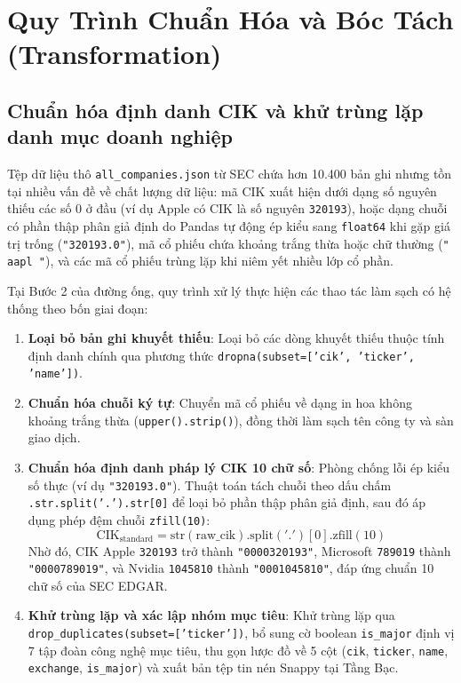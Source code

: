 \section{Quy Trình Chuẩn Hóa và Bóc Tách (Transformation)}

\subsection{Chuẩn hóa định danh CIK và khử trùng lặp danh mục doanh nghiệp}
Tệp dữ liệu thô \texttt{all\_companies.json} từ SEC chứa hơn 10.400 bản ghi nhưng tồn tại nhiều vấn đề về chất lượng dữ liệu: mã CIK xuất hiện dưới dạng số nguyên thiếu các số 0 ở đầu (ví dụ Apple có CIK là số nguyên \texttt{320193}), hoặc dạng chuỗi có phần thập phân giả định do Pandas tự động ép kiểu sang \texttt{float64} khi gặp giá trị trống (\texttt{"320193.0"}), mã cổ phiếu chứa khoảng trắng thừa hoặc chữ thường (\texttt{" aapl "}), và các mã cổ phiếu trùng lặp khi niêm yết nhiều lớp cổ phần.

Tại Bước 2 của đường ống, quy trình xử lý thực hiện các thao tác làm sạch có hệ thống theo bốn giai đoạn:
\begin{enumerate}
    \item \textbf{Loại bỏ bản ghi khuyết thiếu}: Loại bỏ các dòng khuyết thiếu thuộc tính định danh chính qua phương thức \texttt{dropna(subset=['cik', 'ticker', 'name'])}.
    \item \textbf{Chuẩn hóa chuỗi ký tự}: Chuyển mã cổ phiếu về dạng in hoa không khoảng trắng thừa (\texttt{upper().strip()}), đồng thời làm sạch tên công ty và sàn giao dịch.
    \item \textbf{Chuẩn hóa định danh pháp lý CIK 10 chữ số}: Phòng chống lỗi ép kiểu số thực (ví dụ \texttt{"320193.0"}). Thuật toán tách chuỗi theo dấu chấm \texttt{.str.split('.').str[0]} để loại bỏ phần thập phân giả định, sau đó áp dụng phép đệm chuỗi \texttt{zfill(10)}:
    \begin{equation}
        \text{CIK}_{\text{standard}} = \text{str}(\text{raw\_cik}).\text{split}('.')[0].\text{zfill}(10)
    \end{equation}
    Nhờ đó, CIK Apple \texttt{320193} trở thành \texttt{"0000320193"}, Microsoft \texttt{789019} thành \texttt{"0000789019"}, và Nvidia \texttt{1045810} thành \texttt{"0001045810"}, đáp ứng chuẩn 10 chữ số của SEC EDGAR.
    \item \textbf{Khử trùng lặp và xác lập nhóm mục tiêu}: Khử trùng lặp qua \texttt{drop\_duplicates(subset=['ticker'])}, bổ sung cờ boolean \texttt{is\_major} định vị 7 tập đoàn công nghệ mục tiêu, thu gọn lược đồ về 5 cột (\texttt{cik}, \texttt{ticker}, \texttt{name}, \texttt{exchange}, \texttt{is\_major}) và xuất bản tệp tin  nén Snappy tại Tầng Bạc.
\end{enumerate}

